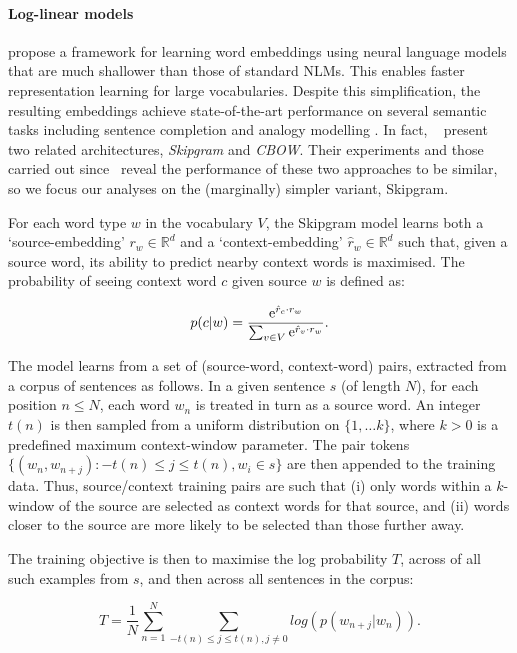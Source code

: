 \paragraph{\bf Log-linear models}
\label{shallow}
\cite{mikolov2013efficient} propose a framework for learning word embeddings using neural language models that are much shallower than those of standard NLMs. This enables faster representation learning for large vocabularies. Despite this simplification, the resulting embeddings achieve state-of-the-art performance on several semantic tasks including sentence completion and analogy modelling \citep{mikolov2013efficient,mikolov2013distributed}. In fact, ~\cite{mikolov2013efficient} present two related architectures, \emph{Skipgram} and \emph{CBOW}. Their experiments and those carried out since~\citep{baroni2014don} reveal the performance of these two approaches to be similar, so we focus our analyses on the (marginally) simpler variant, Skipgram.    

For each word type \(w\) in the vocabulary \(V\), the Skipgram model learns both a `source-embedding' \( r_{w} \in \mathbb{R}^d\) and a `context-embedding' \(\hat{r}_{w} \in \mathbb{R}^d\) such that, given a source word, its ability to predict nearby context words is maximised. The probability of seeing context word \(c\) given source \(w\) is defined as:  

\[p(c|w)  = \frac{\mathrm{e}^{\hat{r}_{c} \cdot r_{w}}}{\sum_{v \in V} \mathrm{e}^{\hat{r}_v\cdot r_{w}}}.\]

The model learns from a set of (source-word, context-word) pairs, extracted from a corpus of sentences as follows. In a given sentence \(s\) (of length \(N\)), for each position \( n \leq N\), each word \(w_n\) is treated in turn as a source word. An integer \( {t(n)} \) is then sampled from a uniform distribution on \( \{1, \dots k \} \), where \(k > 0\) is a predefined maximum context-window parameter. The pair tokens \( \{(w_n, w_{n+j}): -{t(n)}\leq j \leq {t(n)}, w_i \in s \}\) are then appended to the training data. Thus, source/context training pairs are such that (i) only words within a \(k\)-window of the source are selected as context words for that source, and (ii) words closer to the source are more likely to be selected than those further away.

The training objective is then to maximise the log probability \( T\), across of all such examples from \(s\), and then across all sentences in the corpus:

\[ T = \frac{1}{N} \sum_{n=1}^{N} \sum_{-{t(n)}\leq j \leq {t(n)}, j\neq 0} log(  p(w_{n+j}|w_{n}) ). \]

